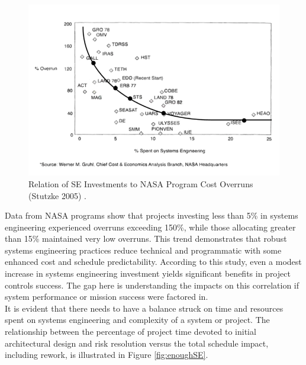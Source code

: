 \begin{figure}[h]
  \centering
  \includegraphics[width=0.7\linewidth]{figures/700px-NASA_Image_Part_1.png}
  \caption{Relation of SE Investments to NASA Program Cost Overruns (Stutzke 2005)
  \cite{sebok_economic_value}.}
  \label{fig:se_investments}
\end{figure}

Data from NASA programs show that projects investing less than 5\% in systems engineering experienced overruns exceeding 150\%, while those allocating greater than 15\% maintained very low overruns. 
This trend demonstrates that robust systems engineering practices reduce technical and programmatic with some enhanced cost and schedule predictability. 
According to this study, even a modest increase in systems engineering investment yields significant benefits in project controls success. 
The gap here is understanding the impacts on this correlation if system performance or mission success were factored in.\\
It is evident that there needs to have a balance struck on time and resources spent on systems engineering and complexity of a system or project.\cite{sebok_economic_value} 
The relationship between the percentage of project time devoted to initial architectural design and risk resolution versus the total schedule impact, including rework, is illustrated in Figure \ref{fig:enoughSE}. 
 
